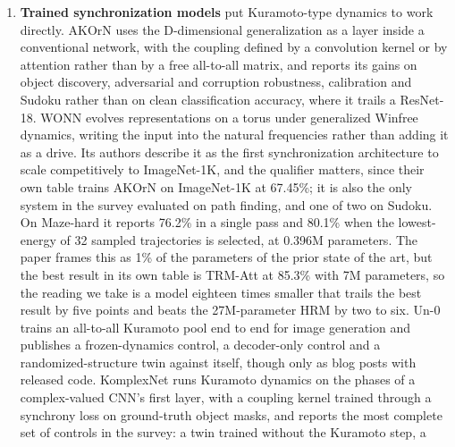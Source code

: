 \documentclass[10pt]{article}
\begin{document}
\begin{enumerate}
  the same \ensuremath{\alpha} the oscillation frequency and states that
  the system has no damping or friction term; \ensuremath{\alpha}
  multiplies the position, enters the Hamiltonian as the restoring
  potential, and cannot dissipate energy, so we read the model as the
  undamped one its name declares. And the LinOSS paper never uses the
  word damping, while D-LinOSS describes its predecessors as undamped
  harmonic oscillators whose discretization couples frequency and
  damping: the dissipation in question belongs to the implicit
  integrator, not to a term of the model.
\item
  \textbf{Trained synchronization models} put Kuramoto-type dynamics to
  work directly. AKOrN \citep{akorn} uses the D-dimensional
  generalization as a layer inside a conventional network, with the
  coupling defined by a convolution kernel or by attention rather than
  by a free all-to-all matrix, and reports its gains on object
  discovery, adversarial and corruption robustness, calibration and
  Sudoku rather than on clean classification accuracy, where it trails a
  ResNet-18. WONN \citep{wonn} evolves representations on a torus under
  generalized Winfree dynamics, writing the input into the natural
  frequencies rather than adding it as a drive. Its authors describe it
  as the first synchronization architecture to scale competitively to
  ImageNet-1K, and the qualifier matters, since their own table trains
  AKOrN on ImageNet-1K at 67.45\%; it is also the only system in the
  survey evaluated on path finding, and one of two on Sudoku. On
  Maze-hard it reports 76.2\% in a single pass and 80.1\% when the
  lowest-energy of 32 sampled trajectories is selected, at 0.396M
  parameters. The paper frames this as 1\% of the parameters of the
  prior state of the art, but the best result in its own table is
  TRM-Att at 85.3\% with 7M parameters, so the reading we take is a
  model eighteen times smaller that trails the best result by five
  points and beats the 27M-parameter HRM by two to six. Un-0
  \citep{un-0} trains an all-to-all Kuramoto pool end to end for image
  generation and publishes a frozen-dynamics control, a decoder-only
  control and a randomized-structure twin against itself, though only as
  blog posts with released code. KomplexNet \citep{muzellec2025} runs
  Kuramoto dynamics on the phases of a complex-valued CNN's first layer,
  with a coupling kernel trained through a synchrony loss on
  ground-truth object masks, and reports the most complete set of
  controls in the survey: a twin trained without the Kuramoto step, a

\end{enumerate}
\end{document}
